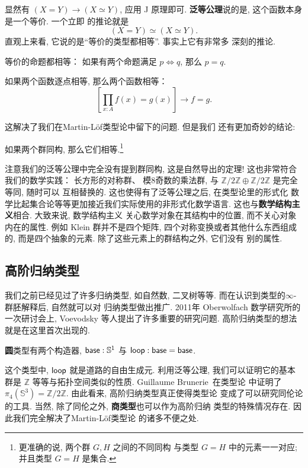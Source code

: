 显然有 \((X = Y) \to (X \simeq Y)\), 应用 J 原理即可.
\textbf{泛等公理}说的是, 这个函数本身是一个等价. 一个立即
的推论就是
\[(X = Y) \simeq (X \simeq Y).\]
直观上来看, 它说的是“等价的类型都相等”. 事实上它有非常多
深刻的推论.
\begin{theorem}[命题外延]
等价的命题都相等： 如果有两个命题满足
\(p \iff q\), 那么 \(p = q\).
\end{theorem}
\begin{theorem}[函数外延]
如果两个函数逐点相等, 那么两个函数相等：
\[\left[\prod_{x:A} f(x) = g(x)\right] \to f = g.\]
\end{theorem}
这解决了我们在Martin-L\"of类型论中留下的问题. 但是我们
还有更加奇妙的结论:
\begin{theorem}
如果两个群同构, 那么它们相等.\footnote{更准确的说, 两个群 \(G, H\) 之间的不同同构
与类型 \(G = H\) 中的元素一一对应; 并且类型 \(G = H\) 是集合.}
\end{theorem}
注意我们的泛等公理中完全没有提到群同构, 这是自然导出的定理!
这也非常符合我们的数学实践： 长方形的对称群、 模8奇数的乘法群,
与 \(\mathbb Z/2\mathbb Z \oplus
\mathbb Z/2\mathbb Z\) 是完全等同, 随时可以
互相替换的. 这也使得有了泛等公理之后, 在类型论里的形式化
数学比起集合论等等更加接近我们实际使用的非形式化数学语言.
这也与\textbf{数学结构主义}相合. 大致来说, 数学结构主义
关心数学对象在其结构中的位置, 而不关心对象内在的属性. 例如
Klein 群并不是四个矩阵, 四个对称变换或者其他什么东西组成的,
而是四个抽象的元素. 除了这些元素上的群结构之外, 它们没有
别的属性.~\cite{awodey:2013:structuralism}

\subsection{高阶归纳类型}
我们之前已经见过了许多归纳类型, 如自然数, 二叉树等等.
而在认识到类型的\(\infty\)-群胚解释后, 自然就可以对
归纳类型做出推广. 2011年 Oberwolfach 数学研究所的
一次研讨会上, Voevodsky 等人提出了许多重要的研究问题.
高阶归纳类型的想法就是在这里首次出现的.

\begin{definition}
\textbf{圆}类型有两个构造器, \(\textsf{base} : \mathbb S^1\)
与 \(\textsf{loop} : \textsf{base} = \textsf{base}\).
\end{definition}
这个类型中, \(\textsf{loop}\) 就是道路的自由生成元.
利用泛等公理, 我们可以证明它的基本群是 \(\mathbb Z\)
等等与拓扑空间类似的性质. Guillaume Brunerie~\cite{brunerie:2016:number}在类型论
中证明了 \(\pi_4(\mathbb S^3) = \mathbb Z / 2\mathbb Z\).
由此看来, 高阶归纳类型真正使得类型论
变成了可以研究同伦论的工具.
当然, 除了同伦之外, \textbf{商类型}也可以作为高阶归纳
类型的特殊情况存在. 因此我们完全解决了Martin-L\"of类型论
的诸多不便之处.

